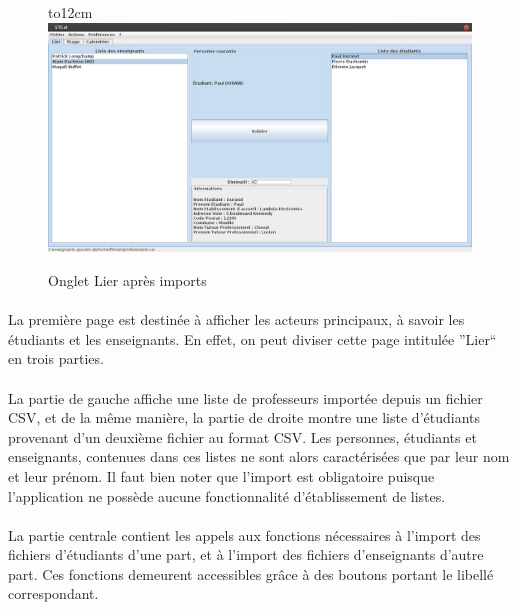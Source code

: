 \documentclass[a4paper,10pt]{report}
\begin{document}
	    \begin{figure}[!h]
	  
	    \hbox to12cm{\hss\includegraphics[width=18cm]{Lier.png}\hss}
	    \caption{Onglet Lier après imports}
	    \end{figure}

	  
	  
	    \paragraph{}
	      La première page est destinée à afficher les acteurs principaux, à savoir les étudiants et les enseignants. 
	      En effet, on peut diviser cette page intitulée ''Lier`` en trois parties.
	      
	    \paragraph{}
	      La partie de gauche affiche une liste de professeurs importée depuis un fichier CSV, et de la même manière, la partie de droite montre une liste d'étudiants provenant d'un deuxième fichier au format CSV.
	      Les personnes, étudiants et enseignants, contenues dans ces listes ne sont alors caractérisées que par leur nom et leur prénom.
	      Il faut bien noter que l'import est obligatoire puisque l'application ne possède aucune fonctionnalité d'établissement de listes.
	    
	    \paragraph{}
	      La partie centrale contient les appels aux fonctions nécessaires à l'import des fichiers d'étudiants d'une part, et à l'import des fichiers d'enseignants d'autre part.
	      Ces fonctions demeurent accessibles grâce à des boutons portant le libellé correspondant.
	     
\end{document}

